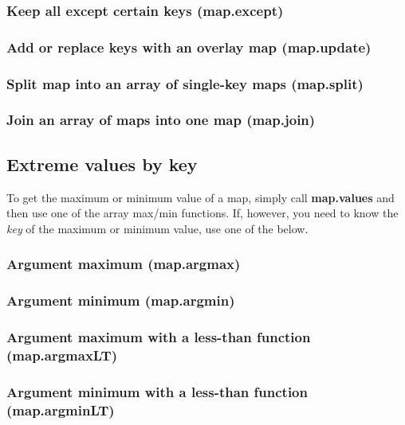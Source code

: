 \documentclass{article}
\newcommand{\PFAf}{\ttfamily\bfseries}
\theoremstyle{definition}
\begin{document}
\subsubsection{Keep all except certain keys (map.except)}

\subsubsection{Add or replace keys with an overlay map (map.update)}

\subsubsection{Split map into an array of single-key maps (map.split)}

\subsubsection{Join an array of maps into one map (map.join)}

\subsection{Extreme values by key}

To get the maximum or minimum value of a map, simply call {\PFAf map.values} and then use one of the array max/min functions. If, however, you need to know the {\it key} of the maximum or minimum value, use one of the below.

\subsubsection{Argument maximum (map.argmax)}

\subsubsection{Argument minimum (map.argmin)}

\subsubsection{Argument maximum with a less-than function (map.argmaxLT)}

\subsubsection{Argument minimum with a less-than function (map.argminLT)}
\end{document}
